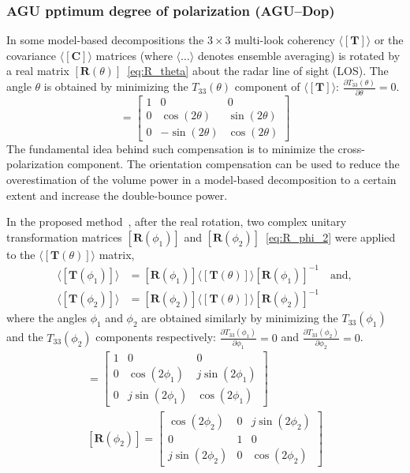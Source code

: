 \subsubsection{AGU pptimum degree of polarization (AGU--Dop)}
In some model-based decompositions the $3\times3$ multi-look coherency $\mathbf{\langle[T]\rangle}$ or the covariance $\mathbf{\langle[C]\rangle}$ matrices (where $\langle\dots\rangle$ denotes ensemble averaging) is rotated by a real matrix $[{\mathbf{R}}(\theta)]$~\eqref{eq:R_theta} about the radar line of sight (LOS). The angle $\theta$ is obtained by minimizing the $T_{33}(\theta)$ component of $\mathbf{\langle[T]\rangle}$: $\frac{\partial T_{33}(\theta)}{\partial \theta}=0$. 
\begin{equation}
[{\mathbf{R}}(\theta)] = \left[ \begin{array}{ccc}
1 &0 & 0 \\
0 & \cos(2\theta) & \sin(2\theta) \\
0 & -\sin(2\theta) & \cos(2\theta)
\end{array}\right] 
\label{eq:R_theta} 
\end{equation}
The fundamental idea behind such compensation is to minimize the cross-polarization component. The orientation compensation can be used to reduce the overestimation of the volume power in a model-based decomposition to a certain extent and increase the double-bounce power. 

In the proposed method~\citep{bhattacharya2015adaptive}, after the real rotation, two complex unitary transformation matrices $[{\mathbf{R}}(\phi_1)]$ and $[{\mathbf{R}}(\phi_2)]$~\eqref{eq:R_phi_2} were applied to the $\langle[{\mathbf{T}}(\theta)]\rangle$ matrix,
\begin{align*}
\langle[{\mathbf{T}}(\phi_1)]\rangle&=[{\mathbf{R}}(\phi_1)]\langle[{\mathbf{T}}(\theta)]\rangle[{\mathbf{R}}(\phi_1)]^{-1} \quad \mbox{and},\\[0.4em] 
\langle[{\mathbf{T}}(\phi_2)]\rangle&=[{\mathbf{R}}(\phi_2)]\langle[{\mathbf{T}}(\theta)]\rangle[{\mathbf{R}}(\phi_2)]^{-1}
\end{align*}
where the angles $\phi_{1}$ and $\phi_{2}$ are obtained similarly by minimizing the  $T_{33}(\phi_{1})$ and the $T_{33}(\phi_{2})$ components respectively: $\frac{\partial T_{33}(\phi_{1})}{\partial \phi_{1}}=0$ and $\frac{\partial T_{33}(\phi_{2})}{\partial \phi_{2}}=0$. 
\begin{gather}
[{\mathbf{R}}(\phi_1)] = \left[ \begin{array}{ccc}
1 & 0 & 0 \\
0 & \cos(2\phi_1) & j\sin(2\phi_1) \\
0 & j\sin(2\phi_1) & \cos(2\phi_1)
\end{array}\right] \label{eq:R_phi_1} \\[0.5em] 
[{\mathbf{R}}(\phi_2)] = \left[ \begin{array}{ccc}
\cos(2\phi_2) & 0 & j\sin(2\phi_2) \\
0 & 1 & 0 \\
j\sin(2\phi_2) & 0 & \cos(2\phi_2)
\end{array}\right] 
\label{eq:R_phi_2}
\end{gather}

